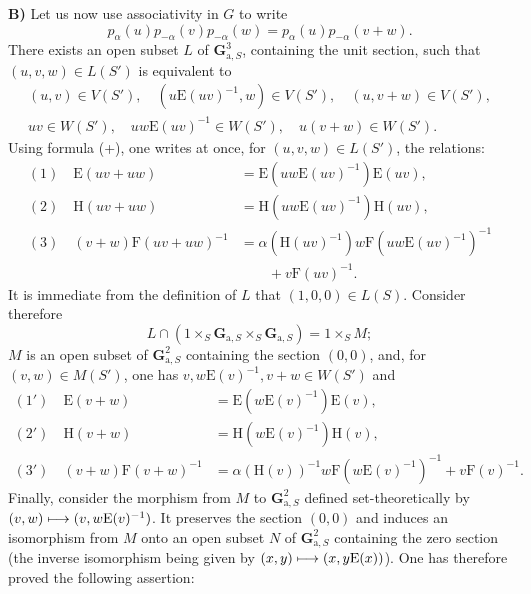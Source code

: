 \textbf{B)} Let us now use associativity in $G$ to write
\[
p_\alpha(u)p_{-\alpha}(v)p_{-\alpha}(w)=p_\alpha(u)p_{-\alpha}(v+w).
\]
There exists an open subset $L$ of $\mathbf G_{\mathrm a,S}^3$, containing the unit section, such that $(u,v,w)\in L(S')$ is equivalent to
\[
\begin{gathered}
(u,v)\in V(S'),\quad(u\mathrm E(uv)^{-1},w)\in V(S'),\quad(u,v+w)\in V(S'),\\
uv\in W(S'),\quad uw\mathrm E(uv)^{-1}\in W(S'),\quad u(v+w)\in W(S').
\end{gathered}
\]
Using formula (+), one writes at once, for $(u,v,w)\in L(S')$, the relations:
\[
\begin{aligned}
(1)\quad\mathrm E(uv+uw)&=\mathrm E(uw\mathrm E(uv)^{-1})\mathrm E(uv),\\
(2)\quad\mathrm H(uv+uw)&=\mathrm H(uw\mathrm E(uv)^{-1})\mathrm H(uv),\\
(3)\quad(v+w)\mathrm F(uv+uw)^{-1}&=\alpha(\mathrm H(uv)^{-1})w\mathrm F(uw\mathrm E(uv)^{-1})^{-1}\\
&\qquad+v\mathrm F(uv)^{-1}.
\end{aligned}
\]
It is immediate from the definition of $L$ that $(1,0,0)\in L(S)$. Consider therefore
\[
L\cap(1\times_S\mathbf G_{\mathrm a,S}\times_S\mathbf G_{\mathrm a,S})=1\times_SM;
\]
$M$ is an open subset of $\mathbf G_{\mathrm a,S}^2$ containing the section $(0,0)$, and, for $(v,w)\in M(S')$, one has $v,w\mathrm E(v)^{-1},v+w\in W(S')$ and
\[
\begin{aligned}
(1')\quad\mathrm E(v+w)&=\mathrm E(w\mathrm E(v)^{-1})\mathrm E(v),\\
(2')\quad\mathrm H(v+w)&=\mathrm H(w\mathrm E(v)^{-1})\mathrm H(v),\\
(3')\quad(v+w)\mathrm F(v+w)^{-1}&=\alpha(\mathrm H(v))^{-1}w\mathrm F(w\mathrm E(v)^{-1})^{-1}+v\mathrm F(v)^{-1}.
\end{aligned}
\]
Finally, consider the morphism from $M$ to $\mathbf G_{\mathrm a,S}^2$ defined set-theoretically by $(v,w)\longmapsto(v,w\mathrm E(v)^{-1})$.{\renewcommand{\thefootnote}{(13)}} It preserves the section $(0,0)$ and induces an isomorphism from $M$ onto an open subset $N$ of $\mathbf G_{\mathrm a,S}^2$ containing the zero section (the inverse isomorphism being given by $(x,y)\longmapsto(x,y\mathrm E(x))$).{\renewcommand{\thefootnote}{(14)}} One has therefore proved the following assertion:

